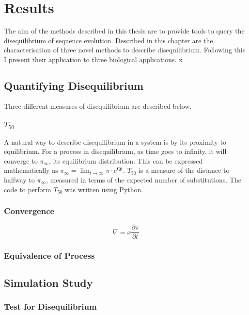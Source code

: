 \chapter{Results}

The aim of the methods described in this thesis are to provide tools to query the disequilibrium of sequence evolution. Described in this chapter are the characterisation of three novel methods to describe disequilibrium. Following this I present their application to three biological applications. 
x
\section{Quantifying Disequilibrium}
Three different measures of disequilibrium are described below. 

\subsection{$T_{50}$}
A natural way to describe disequilibrium in a system is by its proximity to equilibrium. For a process in disequilibrium, as time goes to infinity, it will converge to $\pi_\infty$, its equilibrium distribution. This can be expressed mathematically as $\pi_\infty = \lim_{t \to \infty}\pi \cdot e^{\mathbf{Q}t}.$ ${T_{50}}$ is a measure of the distance to halfway to $\pi_\infty$, measured in terms of the expected number of substitutions. The code to perform $T_{50}$ was written using Python.


\subsection{Convergence}

$$\nabla =x \frac{\partial \pi}{\partial t}$$

\subsection{Equivalence of Process}

\section{Simulation Study}

\subsection{Test for Disequilibrium}

 

